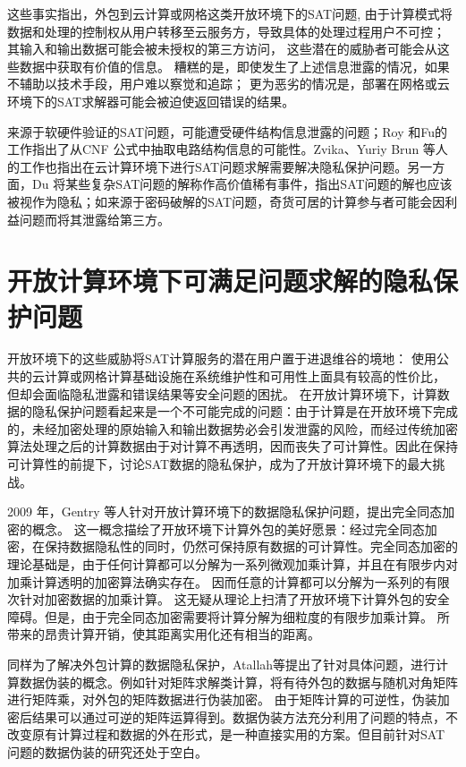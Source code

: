 这些事实指出，外包到云计算或网格这类开放环境下的SAT问题,
由于计算模式将数据和处理的控制权从用户转移至云服务方，导致具体的处理过程用户不可控；
其输入和输出数据可能会被未授权的第三方访问，
这些潜在的威胁者可能会从这些数据中获取有价值的信息。
糟糕的是，即使发生了上述信息泄露的情况，如果不辅助以技术手段，用户难以察觉和追踪；
更为恶劣的情况是，部署在网格或云环境下的SAT求解器可能会被迫使返回错误的结果。

来源于软硬件验证的SAT问题，可能遭受硬件结构信息泄露的问题；Roy 和Fu的工作指出了从CNF 公式中抽取电路结构信息的可能性。Zvika、Yuriy Brun 等人的工作也指出在云计算环境下进行SAT问题求解需要解决隐私保护问题。另一方面，Du 将某些复杂SAT问题的解称作高价值稀有事件，指出SAT问题的解也应该被视作为隐私；如来源于密码破解的SAT问题，奇货可居的计算参与者可能会因利益问题而将其泄露给第三方。

\section{开放计算环境下可满足问题求解的隐私保护问题}
开放环境下的这些威胁将SAT计算服务的潜在用户置于进退维谷的境地：
使用公共的云计算或网格计算基础设施在系统维护性和可用性上面具有较高的性价比，
但却会面临隐私泄露和错误结果等安全问题的困扰。
在开放计算环境下，计算数据的隐私保护问题看起来是一个不可能完成的问题：由于计算是在开放环境下完成的，未经加密处理的原始输入和输出数据势必会引发泄露的风险，而经过传统加密算法处理之后的计算数据由于对计算不再透明，因而丧失了可计算性。因此在保持可计算性的前提下，讨论SAT数据的隐私保护，成为了开放计算环境下的最大挑战。

2009 年，Gentry 等人针对开放计算环境下的数据隐私保护问题，提出完全同态加密的概念。
这一概念描绘了开放环境下计算外包的美好愿景：经过完全同态加密，在保持数据隐私性的同时，仍然可保持原有数据的可计算性。完全同态加密的理论基础是，由于任何计算都可以分解为一系列微观加乘计算，并且在有限步内对加乘计算透明的加密算法确实存在。
因而任意的计算都可以分解为一系列的有限次针对加密数据的加乘计算。
这无疑从理论上扫清了开放环境下计算外包的安全障碍。但是，由于完全同态加密需要将计算分解为细粒度的有限步加乘计算。
所带来的昂贵计算开销，使其距离实用化还有相当的距离。

同样为了解决外包计算的数据隐私保护，Atallah等提出了针对具体问题，进行计算数据伪装的概念。例如针对矩阵求解类计算，将有待外包的数据与随机对角矩阵进行矩阵乘，对外包的矩阵数据进行伪装加密。
由于矩阵计算的可逆性，伪装加密后结果可以通过可逆的矩阵运算得到。数据伪装方法充分利用了问题的特点，不改变原有计算过程和数据的外在形式，是一种直接实用的方案。但目前针对SAT 问题的数据伪装的研究还处于空白。

